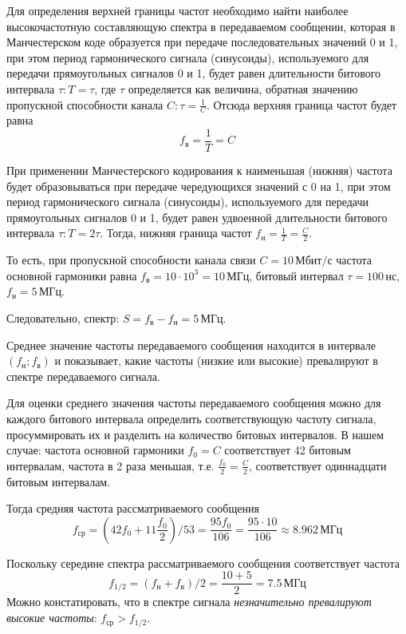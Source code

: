 Для определения верхней границы частот необходимо найти наиболее высокочастотную составляющую спектра в передаваемом сообщении, которая в Манчестерском коде образуется при передаче последовательных значений 0 и 1, при этом период гармонического сигнала (синусоиды), используемого для передачи прямоугольных сигналов 0 и 1, будет равен длительности битового интервала $\tau: T = \tau$, где $\tau$ определяется как величина, обратная значению пропускной способности канала $C: \tau = \frac{1}{C}$. Отсюда верхняя граница частот будет равна \[f_{\text{в}} = \frac{1}{T} = C\]

При применении Манчестерского кодирования к наименьшая (нижняя) частота будет образовываться при передаче чередующихся значений с 0 на 1, при этом период гармонического сигнала (синусоиды), используемого для передачи прямоугольных сигналов 0 и 1, будет равен удвоенной длительности битового интервала $\tau: T = 2\tau$. Тогда, нижняя граница частот $f_{\text{н}} = \frac{1}{T} = \frac{C}{2}$.

То есть, при пропускной способности канала связи $C = 10 \, \text{Мбит/с}$ частота основной гармоники равна $f_{\text{в}} = 10 \cdot 10^3 = 10 \, \text{МГц}$, битовый интервал $\tau = 100 \, \text{нс}$, $f_{\text{н}} = 5 \, \text{МГц}$.

Следовательно, спектр: $S = f_{\text{в}} - f_{\text{н}} = 5 \, \text{МГц}$.

Среднее значение частоты передаваемого сообщения находится в интервале $(f_{\text{н}};f_{\text{в}})$ и показывает, какие частоты (низкие или высокие) превалируют в спектре передаваемого сигнала.

Для оценки среднего значения частоты передаваемого сообщения можно для каждого битового интервала определить соответствующую частоту сигнала, просуммировать их и разделить на количество битовых интервалов. В нашем случае: частота основной гармоники $f_0 = C$ соответствует 42 битовым интервалам, частота в 2 раза меньшая, т.е. $\frac{f_0}{2} = \frac{C}{2}$, соответствует одиннадцати битовым интервалам.

Тогда средняя частота рассматриваемого сообщения
\[
	f_{\text{ср}} = \left(42f_0+11\frac{f_0}{2}\right)/ 53 = \frac{95f_0}{106} = \frac{95 \cdot 10}{106} \approx 8.962 \, \text{МГц}
\]

Поскольку середине спектра рассматриваемого сообщения соответствует частота
\[
	f_{1/2} = (f_{\text{н}} + f_{\text{в}}) /2 = \frac{10 + 5}{2} = 7.5 \, \text{МГц}
\]
Можно констатировать, что в спектре сигнала \textit{незначительно превалируют высокие частоты}: $f_{\text{ср}} > f_{1/2}$.

